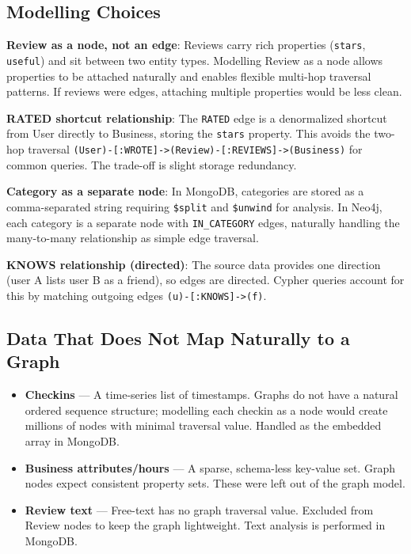 \documentclass[12pt,a4paper]{article}
\newcommand{\code}[1]{\texttt{#1}}
\begin{document}
\subsection*{Modelling Choices}

\textbf{Review as a node, not an edge}: Reviews carry rich properties
(\code{stars}, \code{useful}) and sit between two entity types. Modelling
Review as a node allows properties to be attached naturally and enables
flexible multi-hop traversal patterns. If reviews were edges, attaching
multiple properties would be less clean.

\textbf{RATED shortcut relationship}: The \code{RATED} edge is a denormalized
shortcut from User directly to Business, storing the \code{stars} property.
This avoids the two-hop traversal
\code{(User)-[:WROTE]->(Review)-[:REVIEWS]->(Business)} for common queries.
The trade-off is slight storage redundancy.

\textbf{Category as a separate node}: In MongoDB, categories are stored as a
comma-separated string requiring \code{\$split} and \code{\$unwind} for
analysis. In Neo4j, each category is a separate node with \code{IN\_CATEGORY}
edges, naturally handling the many-to-many relationship as simple edge
traversal.

\textbf{KNOWS relationship (directed)}: The source data provides one direction
(user A lists user B as a friend), so edges are directed. Cypher queries
account for this by matching outgoing edges \code{(u)-[:KNOWS]->(f)}.

\subsection*{Data That Does Not Map Naturally to a Graph}

\begin{itemize}
  \item \textbf{Checkins} --- A time-series list of timestamps. Graphs do not
    have a natural ordered sequence structure; modelling each checkin as a node
    would create millions of nodes with minimal traversal value. Handled as the
    embedded array in MongoDB.

  \item \textbf{Business attributes/hours} --- A sparse, schema-less key-value
    set. Graph nodes expect consistent property sets. These were left out of
    the graph model.

  \item \textbf{Review text} --- Free-text has no graph traversal value.
    Excluded from Review nodes to keep the graph lightweight. Text analysis is
    performed in MongoDB.
\end{itemize}
\end{document}
